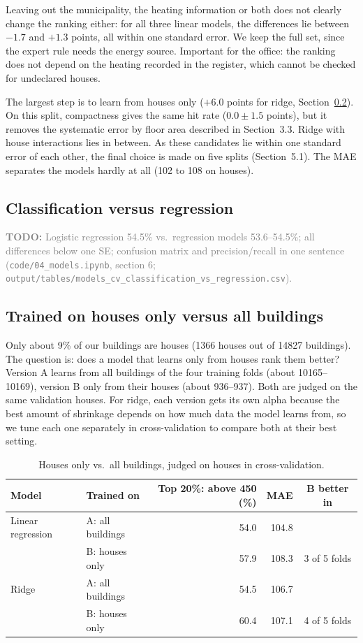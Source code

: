 \documentclass[11pt,a4paper]{article}
\newcommand{\todo}[1]{\noindent\textcolor{gray}{\small\textbf{TODO:} #1}\par\medskip}
\begin{document}
Leaving out the municipality, the heating information or both does not clearly change the ranking either:
for all three linear models, the differences lie between $-1.7$ and $+1.3$ points, all within one standard
error. We keep the full set, since the expert rule needs the energy source. Important for the office: the
ranking does not depend on the heating recorded in the register, which cannot be checked for undeclared houses.

The largest step is to learn from houses only ($+6.0$ points for ridge, Section~\ref{sec:housesonly}). On this split,
compactness gives the same hit rate ($0.0 \pm 1.5$ points), but it removes the systematic error by floor area
described in Section~3.3. Ridge with house interactions lies in between. As these candidates lie within one
standard error of each other, the final choice is made on five splits (Section~5.1). The MAE separates the
models hardly at all (102 to 108 on houses).

\subsection{Classification versus regression}
\todo{Logistic regression 54.5\% vs.\ regression models 53.6--54.5\%; all differences below one SE; confusion matrix
and precision/recall in one sentence (\texttt{code/04\_models.ipynb}, section 6; \texttt{output/tables/models\_cv\_classification\_vs\_regression.csv}).}


\subsection{Trained on houses only versus all buildings}\label{sec:housesonly}
Only about 9\% of our buildings are houses (1366 houses out of 14827 buildings). The question is: does a model that learns only from houses rank them better? Version A learns from all buildings of the four training folds (about 10165--10169), version B only from their houses (about 936--937). Both are judged on the same validation houses. For ridge, each version gets its own alpha because the best amount of shrinkage depends on how much data the model learns from, so we tune each one separately in cross-validation to compare both at their best setting.

\begin{table}[ht]
\centering\small
\begin{tabular}{llrrc}
\toprule
Model & Trained on & Top 20\%: above 450 (\%) & MAE & B better in \\
\midrule
Linear regression & A: all buildings & 54.0 & 104.8 & \\
                  & B: houses only   & 57.9 & 108.3 & 3 of 5 folds \\
Ridge             & A: all buildings & 54.5 & 106.7 & \\
                  & B: houses only   & 60.4 & 107.1 & 4 of 5 folds \\
\bottomrule
\end{tabular}
\caption{Houses only vs.\ all buildings, judged on houses in cross-validation.}
\label{tab:housesonly}
\end{table}
\end{document}
